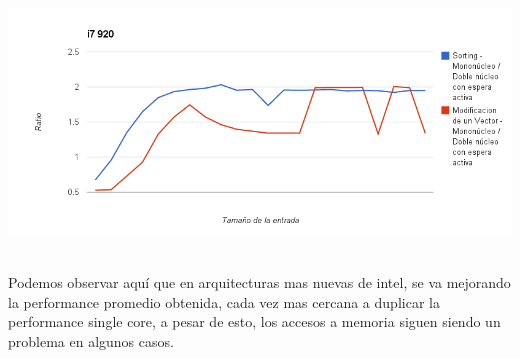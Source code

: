 	\begin{center}
	    \includegraphics[height=7cm]{images/i7-vectorsum-sorting.png}
	\end{center}

	Podemos observar aquí que en arquitecturas mas nuevas de intel, se va mejorando la performance promedio obtenida, cada vez mas cercana a duplicar la performance single core, a pesar de esto, los accesos a memoria siguen siendo un problema en algunos casos.

